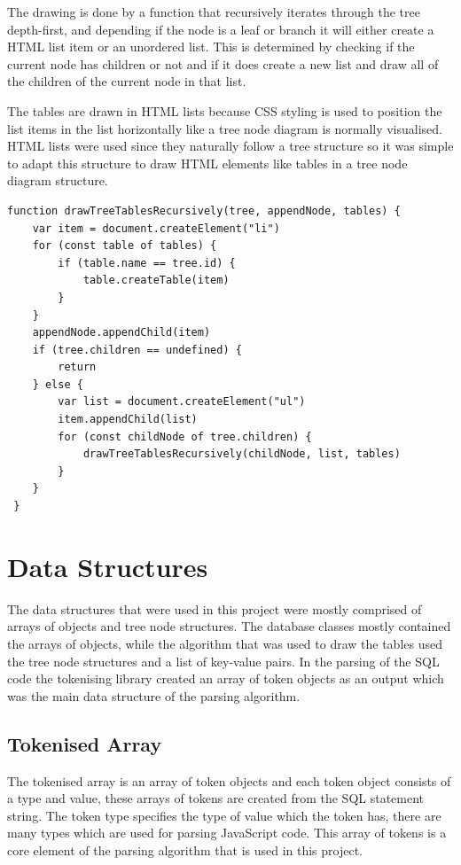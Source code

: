 The drawing is done by a function that recursively iterates through the tree depth-first, and depending if the node is a leaf or branch it will either create a HTML list item or an unordered list. This is determined by checking if the current node has children or not and if it does create a new list and draw all of the children of the current node in that list. 

The tables are drawn in HTML lists because CSS styling is used to position the list items in the list horizontally like a tree node diagram is normally visualised. HTML lists were used since they naturally follow a tree structure so it was simple to adapt this structure to draw HTML elements like tables in a tree node diagram structure. 

 \begin{lstlisting}[style=JavaScript, caption={JavaScript function that draws a list of tables recursively in HTML list elements.}]
 function drawTreeTablesRecursively(tree, appendNode, tables) {
 	var item = document.createElement("li")
 	for (const table of tables) {
 		if (table.name == tree.id) {
 			table.createTable(item)
 		}
 	}
 	appendNode.appendChild(item)
 	if (tree.children == undefined) {
 		return
 	} else {
 		var list = document.createElement("ul")
 		item.appendChild(list)
 		for (const childNode of tree.children) {
 			drawTreeTablesRecursively(childNode, list, tables)
 		}
 	}
 }
\end{lstlisting}

\section{Data Structures}

The data structures that were used in this project were mostly comprised of arrays of objects and tree node structures. The database classes mostly contained the arrays of objects, while the algorithm that was used to draw the tables used the tree node structures and a list of key-value pairs. In the parsing of the SQL code the tokenising library \cite{tokeniser} created an array of token objects as an output which was the main data structure of the parsing algorithm.

\subsection{Tokenised Array}

The tokenised array is an array of token objects and each token object consists of a type and value, these arrays of tokens are created from the SQL statement string. The token type specifies the type of value which the token has, there are many types which are used for parsing JavaScript code. This array of tokens is a core element of the parsing algorithm that is used in this project.

